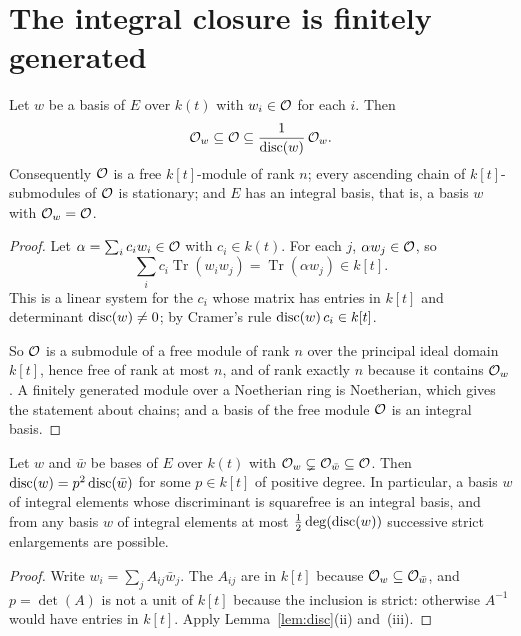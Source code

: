 \section{The integral closure is finitely generated}\label{sec:prelim-fg}

\begin{theorem}\label{thm:closure-fg}
Let $w$ be a basis of $E$ over $k(t)$ with $w_i \in \mathcal{O}$ for each $i$. Then
\[
  \mathcal{O}_w \subseteq \mathcal{O} \subseteq \frac{1}{\operatorname{disc}(w)}\, \mathcal{O}_w .
\]
Consequently $\mathcal{O}$ is a free $k[t]$-module of rank $n$; every ascending chain
of $k[t]$-submodules of $\mathcal{O}$ is stationary; and $E$ has an integral basis,
that is, a basis $w$ with $\mathcal{O}_w = \mathcal{O}$.
\end{theorem}

\begin{proof}
Let $\alpha = \sum_i c_i w_i \in \mathcal{O}$ with $c_i \in k(t)$. For each $j$,
$\alpha w_j \in \mathcal{O}$, so
\[
  \sum_i c_i \operatorname{Tr}(w_i w_j) = \operatorname{Tr}(\alpha w_j) \in k[t] .
\]
This is a linear system for the $c_i$ whose matrix has entries in $k[t]$ and
determinant $\operatorname{disc}(w) \ne 0$; by Cramer's rule $\operatorname{disc}(w)\, c_i \in k[t]$.

So $\mathcal{O}$ is a submodule of a free module of rank $n$ over the principal ideal
domain $k[t]$, hence free of rank at most $n$, and of rank exactly $n$ because
it contains $\mathcal{O}_w$. A finitely generated module over a Noetherian ring is
Noetherian, which gives the statement about chains; and a basis of the free
module $\mathcal{O}$ is an integral basis.
\end{proof}

\begin{corollary}\label{cor:disc-drops}
Let $w$ and $\bar w$ be bases of $E$ over $k(t)$ with $\mathcal{O}_w \subsetneq
\mathcal{O}_{\bar w} \subseteq \mathcal{O}$. Then $\operatorname{disc}(w) = p^2 \operatorname{disc}(\bar w)$ for some $p
\in k[t]$ of positive degree. In particular, a basis $w$ of integral elements
whose discriminant is squarefree is an integral basis, and from any basis $w$
of integral elements at most $\frac12 \deg(\operatorname{disc}(w))$ successive strict
enlargements are possible.
\end{corollary}

\begin{proof}
Write $w_i = \sum_j A_{ij} \bar w_j$. The $A_{ij}$ are in $k[t]$ because $\mathcal{O}_w
\subseteq \mathcal{O}_{\bar w}$, and $p = \det(A)$ is not a unit of $k[t]$ because the
inclusion is strict: otherwise $A^{-1}$ would have entries in $k[t]$. Apply
Lemma~\ref{lem:disc}(ii) and~(iii).
\end{proof}

